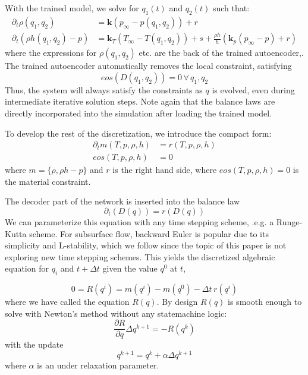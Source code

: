 \documentclass[]{article}
\begin{document}
With the trained model, we solve for \(q_1(t)\) and \(q_2(t)\) such that:
\begin{align}
\partial_t \rho(q_1,q_2) & = \mathbf{k} \left( p_\infty-p(q_1,q_2) \right)  + r \\
\partial_t \left(\rho h(q_1,q_2)-p\right) &
                                            =\mathbf{k}_T(T_\infty-T(q_1,q_2))  + s + \frac{\rho h}{h}\left(\mathbf{k}_p(p_\infty - p) + r\right)
\end{align}
where the expressions for  \(\rho(q_1,q_2)\) etc. are the back of the
trained autoencoder,. The trained
autoencoder automatically removes the local constraint, satisfying
\begin{equation}
eos(D(q_1,q_2)) = 0 \, \forall \,q_1,q_2
\end{equation}
Thus, the system will always satisfy the constraints as $q$ is
evolved, even during intermediate iterative solution steps. Note again
that the balance laws are directly incorporated into the simulation
after loading the trained model.

To develop the rest of the discretization, we introduce the compact form:
\begin{align}
\partial_t m(T,p,\rho,h) &= r(T,p,\rho,h)\\
eos(T,p,\rho,h) &= 0
\end{align}
where $m=\{\rho,\rho h -p\}$ and $r$ is the right hand side, where
$eos(T,p,\rho,h)=0$ is the material constraint.


The decoder part of the network is inserted into the balance law
\begin{equation}
\partial_t (D(q)) = r(D(q))
\end{equation}
We can parameterize this equation with any time stepping scheme, .e.g. a
Runge-Kutta scheme. For subsurface flow, backward Euler is popular due
to its simplicity and L-stability, which we follow since the topic of
this paper is not exploring new time stepping schemes. This yields the
discretized algebraic equation for \(q_i\) and \(t+\Delta t\) given the
value \(q^0\) at \(t\),

\begin{equation}
0 = R(q^i) = m(q^{i}) - m(q^{0}) - \Delta t \, r(q^i)
\end{equation}
where we have called the equation \(R(q)\). By design \(R(q)\) is smooth
enough to solve with Newton's method without any statemachine logic:
\begin{equation}
\frac{\partial R}{\partial q} \Delta q^{k+1} = - R(q^k)
\end{equation}
with the update
\begin{equation}
q^{k+1} = q^k + \alpha\Delta q^{k+1}
\end{equation}
where $\alpha$ is an under relaxation parameter.
\end{document}
